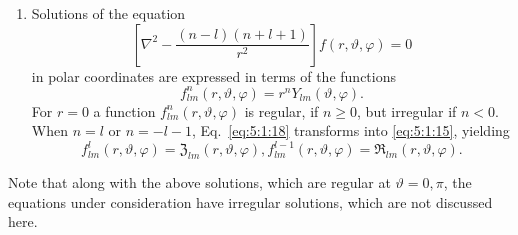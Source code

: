 \begin{enumerate}[label=(\alph*)]
The functions $\mathfrak{L}_{l m}(r, \vartheta, \varphi)=i^{l} j_{l}(k r) Y_{l m}(\vartheta, \varphi)$ and $\mathfrak{N}_{l m}(r, \vartheta, \varphi)=i^{l} n_{l}(k r) Y_{l m}(\vartheta, \varphi)$ are called the standing spherical waves; $\mathfrak{L}_{l m}$ is regular at $r=0$, whereas $\mathfrak{N}_{l m}$ is irregular. The functions $\mathfrak{B}_{l m}^{(1)}(r, \vartheta, \varphi)= i^{l} h_{l}^{(1)}(k r) Y_{l m}(\vartheta, \varphi)$ and $\mathfrak{B}_{l m}^{(2)}(r, \vartheta, \varphi)=i^{l} h_{l}^{(2)}(k r) Y_{l m}(\vartheta, \varphi)$ are called the running spherical waves. The first of these corresponds to a spherical wave which converges to the origin, $r=0$, while the second corresponds to an outgoing spherical wave. In the limit $k \rightarrow 0$ Eq.~\eqref{eq:5:1:17} transforms into \eqref{eq:5:1:15}. In this case
\[
\mathfrak{L}_{l m}(r, \vartheta, \varphi) \rightarrow \mathfrak{Z}_{l m}(r, \vartheta, \varphi), \mathfrak{N}_{l m}(r, \vartheta, \varphi) \rightarrow \mathfrak{R}_{l m}(r, \vartheta, \varphi).
\]
\item Solutions of the equation
\begin{equation}
\left[\nabla^{2}-\frac{(n-l)(n+l+1)}{r^{2}}\right] f(r, \vartheta, \varphi)=0 \label{eq:5:1:18}
\end{equation}
in polar coordinates are expressed in terms of the functions
\[
f_{l m}^{n}(r, \vartheta, \varphi)=r^{n} Y_{l m}(\vartheta, \varphi).
\]
For $r=0$ a function $f_{l m}^{n}(r, \vartheta, \varphi)$ is regular, if $n \geq 0$, but irregular if $n<0$. When $n=l$ or $n=-l-1$, Eq.~\eqref{eq:5:1:18} transforms into \eqref{eq:5:1:15}, yielding
\begin{equation}
f_{l m}^{l}(r, \vartheta, \varphi)=\mathfrak{Z}_{l m}(r, \vartheta, \varphi), f_{l m}^{l-1}(r, \vartheta, \varphi)=\mathfrak{R}_{l m}(r, \vartheta, \varphi) .\label{eq:5:1:19}
\end{equation}
\end{enumerate}
Note that along with the above solutions, which are regular at $\vartheta=0, \pi$, the equations under consideration have irregular solutions, which are not discussed here.

